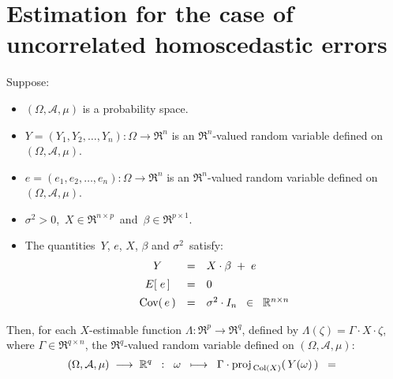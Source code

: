 

\section{Estimation for the case of uncorrelated homoscedastic errors}
\setcounter{theorem}{0}
\setcounter{equation}{0}

\renewcommand{\theenumi}{\roman{enumi}}
\renewcommand{\labelenumi}{\textnormal{(\theenumi)}$\;\;$}


\begin{theorem}
\mbox{}
\vskip 0.1cm
\noindent
Suppose:
\begin{itemize}
\item
	$(\Omega,\mathcal{A},\mu)$ is a probability space.
\item
	$Y = (Y_{1}, Y_{2}, \ldots, Y_{n}) : \Omega \longrightarrow \Re^{n}$ is an $\Re^{n}$-valued random variable
	defined on $(\Omega,\mathcal{A},\mu)$.
\item
	$e = (e_{1}, e_{2}, \ldots, e_{n}) : \Omega \longrightarrow \Re^{n}$ is an $\Re^{n}$-valued random variable
	defined on $(\Omega,\mathcal{A},\mu)$.
\item
	$\sigma^{2} > 0$,\, $X \in \Re^{n \times p}$\, and \,$\beta \in \Re^{p \times 1}$.
\item
	The quantities \,$Y$, $e$, $X$, $\beta$ and $\sigma^{2}$\, satisfy:
	\begin{equation*}
	\begin{array}{ccl}
	Y & = & X \cdot \beta \; + \; e
	\\
	E\!\left[\;e\,\right] &  \overset{{\color{white}\vert}}{=} & 0
	\\
	\Cov\!\left(\,e\,\right) & \overset{{\color{white}\vert}}{=} & \sigma^{2} \cdot I_{n} \;\; \in \;\; \Re^{n \times n}
	\end{array}
	\end{equation*}
\end{itemize}
Then,
for each $X$-estimable function $\Lambda : \Re^{p} \longrightarrow \Re^{q}$,
defined by $\Lambda(\zeta) = \Gamma \cdot X \cdot \zeta$, where $\Gamma \in \Re^{q \times n}$,
the $\Re^{q}$-valued random variable defined on $(\Omega,\mathcal{A},\mu)$:
\begin{equation*}
(\Omega,\mathcal{A},\mu) \;\longrightarrow\; \Re^{q}
\;\; : \;\;
\omega
\;\;\longmapsto\;\;
\Gamma \cdot \proj_{\,\Col(X)}\!\left(\,Y(\omega)\,\right)
\;\;=\;\;

\end{equation*}
\end{theorem}
